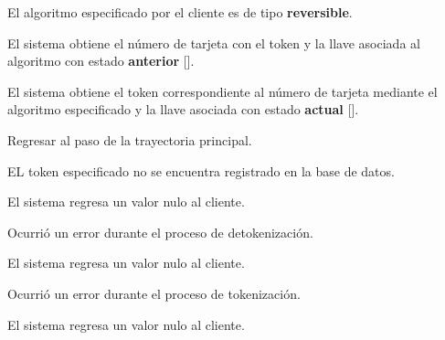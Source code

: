 {  \begin{trayectoriaAlternativa}
    {El algoritmo especificado por el cliente es de tipo \textbf{reversible}.}

    \item El sistema obtiene el número de tarjeta con el token y la llave
      asociada al algoritmo con estado \textbf{anterior}
      [].

    \item El sistema obtiene el token correspondiente al número de tarjeta
      mediante el algoritmo especificado y la llave asociada con estado
      \textbf{actual} [].

    \item Regresar al paso  de la trayectoria
      principal.

  \end{trayectoriaAlternativa}

  \begin{trayectoriaAlternativa}
    {EL token especificado no se encuentra registrado en la base de datos.}

    \item El sistema regresa un valor nulo al cliente.

  \end{trayectoriaAlternativa}

  \begin{trayectoriaAlternativa}
    {Ocurrió un error durante el proceso de detokenización.}

    \item El sistema regresa un valor nulo al cliente.

  \end{trayectoriaAlternativa}

  \begin{trayectoriaAlternativa}
    {Ocurrió un error durante el proceso de tokenización.}

    \item El sistema regresa un valor nulo al cliente.

  \end{trayectoriaAlternativa}

}
